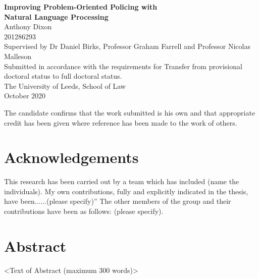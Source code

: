 \documentclass[11pt, a4paper]{book}
\begin{document}
\pagestyle{empty} \thispagestyle{empty}
\begin{center}
{\LARGE \bf  Improving Problem-Oriented Policing with\\ Natural Language Processing}\\[5cm]

{\Large Anthony Dixon\\ 201286293}\\[2cm]

{\large Supervised by Dr Daniel Birks, Professor Graham Farrell and Professor Nicolas Malleson}\\[2cm]

{\large Submitted in accordance with the requirements for Transfer from provisional doctoral status to full doctoral status.}\\[1cm]


{\large The University of Leeds, School of Law}\\[1cm]

{\Large October 2020}\\ \vfill

{\large The candidate confirms that the work submitted is his own
and that appropriate credit has been given where reference has been
made to the work of others.}
\end{center}

\newpage

\chapter*{Acknowledgements}
This research has been carried out by a team which has included (name the individuals). My own contributions, fully and explicitly indicated in the thesis, have been......(please specify)” The other members of the group and their contributions have been as follows: (please specify).

\chapter*{Abstract}
<Text of Abstract  (maximum 300 words)>

\newpage ~ \newpage
{}
\setcounter{page}{1}




\tableofcontents
\pagestyle{plain}
\newpage 

\listoffigures 

\newpage 

\listoftables

\newpage 
{}
\setcounter{page}{1}
\end{document}
